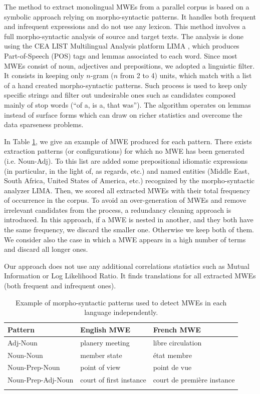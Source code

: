 \documentclass[output=paper,modfonts,nonflat]{langsci/langscibook}
\begin{document}
The method to extract monolingual MWEs from a parallel corpus is based on a symbolic approach relying on morpho-syntactic patterns. 
It handles both frequent and infrequent expressions and do not use any lexicon. This method involves a full morpho-syntactic analysis of source and target texts. 
The analysis is done using the CEA LIST Multilingual Analysis platform LIMA \citep{besancon2010}, which produces Part-of-Speech (POS) tags and lemmas associated to each word. Since most MWEs consist of noun, adjectives and prepositions, we adopted a linguistic filter. 
It consists in keeping only $n$-gram ($n$ from 2 to 4) units, which match with a list of a hand created morpho-syntactic patterns. 
Such process is used to keep only specific strings and filter out undesirable ones such as candidates composed mainly of stop words (``of a, is a, that was''). 
The algorithm operates on lemmas instead of surface forms which can draw on richer statistics and overcome the data sparseness problems. 

In Table \ref{MWEexamplespatterns}, we give an example of MWE produced for each pattern. There exists extraction patterns (or configurations) for which no MWE has been generated (i.e. Noun-Adj). 
To this list are added some prepositional idiomatic expressions (in particular, in the light of, as regards, etc.) and named entities (Middle East, South Africa, United States of America, etc.) recognized by the morpho-syntactic analyzer LIMA. 
Then, we scored all extracted MWEs with their total frequency of occurrence in the corpus. To avoid an over-generation of MWEs and remove irrelevant candidates from the process, a redundancy cleaning approach is introduced.
In this approach, if a MWE is nested in another, and they both have the same frequency, we discard the smaller one. Otherwise we keep both of them. We consider also the case in which a MWE appears in a high number of terms and discard all longer ones. 

Our approach does not use any additional correlations statistics such as Mutual Information or Log Likelihood Ratio. It finds translations for all extracted MWEs (both frequent and infrequent ones).

\begin{table}
\scriptsize
\centering
\caption{Example of morpho-syntactic patterns used to detect MWEs in each language independently.}
\label{MWEexamplespatterns}
 \begin{tabular}{lll} 
  \lsptoprule
            Pattern & English MWE & French MWE \\ 
  \midrule
            Adj-Noun & planery meeting & libre circulation\\ 
            Noun-Noun & member state & état membre \\
            Noun-Prep-Noun & point of view & point de vue \\
            Noun-Prep-Adj-Noun & court of first instance & court de première instance \\
    \lspbottomrule
 \end{tabular}
\end{table}
\end{document}
